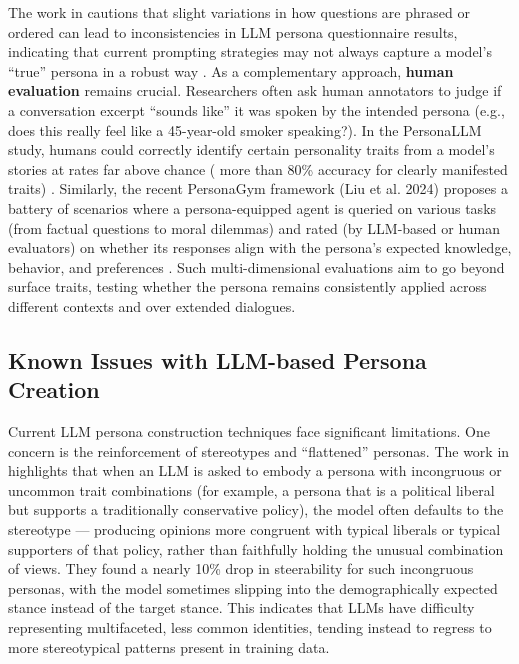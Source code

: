 The work in \cite{shu-etal-2024-personality-tests} cautions that slight variations in how questions are phrased or ordered can lead to inconsistencies in LLM persona questionnaire results, indicating that current prompting strategies may not always capture a model’s ``true'' persona in a robust way \cite{shu-etal-2024-personality-tests}. As a complementary approach, \textbf{human evaluation} remains crucial. Researchers often ask human annotators to judge if a conversation excerpt ``sounds like'' it was spoken by the intended persona (e.g., does this really feel like a 45-year-old smoker speaking?). In the PersonaLLM study, humans could correctly identify certain personality traits from a model's stories at rates far above chance ( more than 80\% accuracy for clearly manifested traits) \cite{jiang-etal-2023-personallm}. Similarly, the recent PersonaGym framework (Liu et al. 2024) proposes a battery of scenarios where a persona-equipped agent is queried on various tasks (from factual questions to moral dilemmas) and rated (by LLM-based or human evaluators) on whether its responses align with the persona’s expected knowledge, behavior, and preferences \cite{liu-etal-2024-personagym}. Such multi-dimensional evaluations aim to go beyond surface traits, testing whether the persona remains consistently applied across different contexts and over extended dialogues.


\subsection{Known Issues with LLM-based Persona Creation}
Current LLM persona construction techniques face significant limitations. One concern is the reinforcement of stereotypes and ``flattened'' personas. The work in \cite{liu-etal-2024-evaluating-large} highlights that when an LLM is asked to embody a persona with incongruous or uncommon trait combinations (for example, a persona that is a political liberal but supports a traditionally conservative policy), the model often defaults to the stereotype --- producing opinions more congruent with typical liberals or typical supporters of that policy, rather than faithfully holding the unusual combination of views. They found a nearly 10\% drop in steerability for such incongruous personas, with the model sometimes slipping into the demographically expected stance instead of the target stance. This indicates that LLMs have difficulty representing multifaceted, less common identities, tending instead to regress to more stereotypical patterns present in training data.

